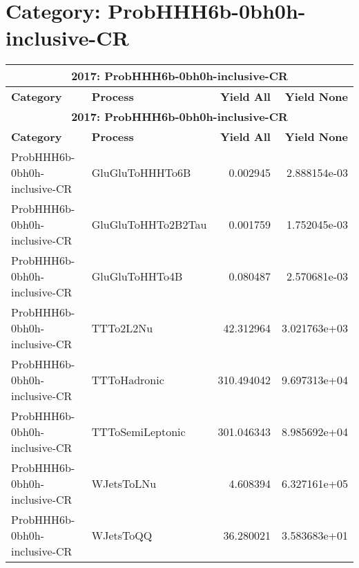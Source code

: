 \documentclass{article}
\begin{document}
\section*{Category: ProbHHH6b-0bh0h-inclusive-CR}
\begin{longtable}[c]{|l|l|r|r|}
\hline
\multicolumn{4}{|c|}{\textbf{2017: ProbHHH6b-0bh0h-inclusive-CR}} \\
\hline
\textbf{Category} & \textbf{Process} & \textbf{Yield All} & \textbf{Yield None} \\
\hline
\endfirsthead
\hline
\multicolumn{4}{|c|}{\textbf{2017: ProbHHH6b-0bh0h-inclusive-CR}} \\
\hline
\textbf{Category} & \textbf{Process} & \textbf{Yield All} & \textbf{Yield None} \\
\hline
\endhead
ProbHHH6b-0bh0h-inclusive-CR & GluGluToHHHTo6B & 0.002945 & 2.888154e-03 \\
\hline
ProbHHH6b-0bh0h-inclusive-CR & GluGluToHHTo2B2Tau & 0.001759 & 1.752045e-03 \\
\hline
ProbHHH6b-0bh0h-inclusive-CR & GluGluToHHTo4B & 0.080487 & 2.570681e-03 \\
\hline
ProbHHH6b-0bh0h-inclusive-CR & TTTo2L2Nu & 42.312964 & 3.021763e+03 \\
\hline
ProbHHH6b-0bh0h-inclusive-CR & TTToHadronic & 310.494042 & 9.697313e+04 \\
\hline
ProbHHH6b-0bh0h-inclusive-CR & TTToSemiLeptonic & 301.046343 & 8.985692e+04 \\
\hline
ProbHHH6b-0bh0h-inclusive-CR & WJetsToLNu & 4.608394 & 6.327161e+05 \\
\hline
ProbHHH6b-0bh0h-inclusive-CR & WJetsToQQ & 36.280021 & 3.583683e+01 \\
\hline
\end{longtable}
\end{document}
